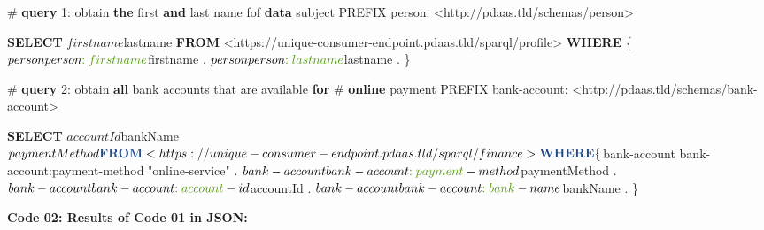 \documentclass[12pt,english,a4paper,titlepage,cleardoublepage=empty,dottedtoc]{report}
\newenvironment{Shaded}{\begin{snugshade}}{\end{snugshade}}
\newcommand{\KeywordTok}[1]{\textcolor[rgb]{0.13,0.29,0.53}{\textbf{#1}}}
\newcommand{\DecValTok}[1]{\textcolor[rgb]{0.00,0.00,0.81}{#1}}
\newcommand{\CharTok}[1]{\textcolor[rgb]{0.31,0.60,0.02}{#1}}
\newcommand{\OtherTok}[1]{\textcolor[rgb]{0.56,0.35,0.01}{#1}}
\newcommand{\FunctionTok}[1]{\textcolor[rgb]{0.00,0.00,0.00}{#1}}
\newcommand{\NormalTok}[1]{#1}
\begin{document}
\begin{Shaded}
\begin{Highlighting}[numbers=left,,]
\NormalTok{# }\KeywordTok{query} \DecValTok{1}\NormalTok{: obtain }\KeywordTok{the} \FunctionTok{first} \KeywordTok{and} \FunctionTok{last}\NormalTok{ name fof }\KeywordTok{data}\NormalTok{ subject}
\NormalTok{PREFIX person: <http://pdaas.tld/schemas/person>}

\KeywordTok{SELECT}\NormalTok{ $firstname $lastname}
\KeywordTok{FROM}\NormalTok{ <https://unique-consumer-endpoint.pdaas.tld/sparql/profile>}
\KeywordTok{WHERE}\NormalTok{ \{}
\NormalTok{    $person person}\CharTok{:firstname}\NormalTok{ $firstname .}
\NormalTok{    $person person}\CharTok{:lastname}\NormalTok{ $lastname .}
\NormalTok{\}}


\NormalTok{# }\KeywordTok{query} \DecValTok{2}\NormalTok{: obtain }\KeywordTok{all}\NormalTok{ bank accounts that are available }\KeywordTok{for} 
\NormalTok{# }\KeywordTok{online}\NormalTok{ payment}
\NormalTok{PREFIX bank-account: <http://pdaas.tld/schemas/bank-account>}

\KeywordTok{SELECT}\NormalTok{ $accountId $bankName $paymentMethod}
\KeywordTok{FROM}\NormalTok{ <https://unique-consumer-endpoint.pdaas.tld/sparql/finance>}
\KeywordTok{WHERE}\NormalTok{ \{}
\NormalTok{    $bank-account bank-account}\CharTok{:payment}\NormalTok{-method }\OtherTok{"online-service"}\NormalTok{ .}
\NormalTok{    $bank-account bank-account}\CharTok{:payment}\NormalTok{-method $paymentMethod .}
\NormalTok{    $bank-account bank-account}\CharTok{:account}\NormalTok{-id $accountId . }
\NormalTok{    $bank-account bank-account}\CharTok{:bank}\NormalTok{-name $bankName .}
\NormalTok{\}}
\end{Highlighting}
\end{Shaded}

\newpage

\textbf{\protect\hypertarget{code-02_sparql-query-results}{}{Code 02:
Results of Code 01 in JSON}:}
\end{document}
